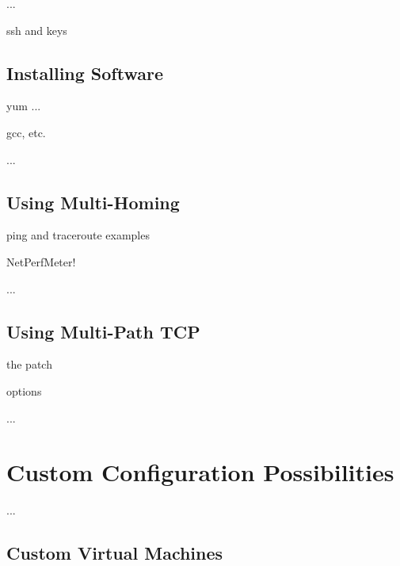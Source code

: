 ...

ssh and keys



\section{Installing Software}
\label{sec:Installing-Software}

yum ...

gcc, etc.

...


\section{Using Multi-Homing}
\label{sec:Using-Multi-Homing}

ping and traceroute examples

NetPerfMeter!

...


\section{Using Multi-Path TCP}
\label{sec:Using-Multi-Path-TCP}

the patch

options

...



\chapter{Custom Configuration Possibilities}
\label{cha:Custom-Configuration-Possibilities}

...


\section{Custom Virtual Machines}
\label{sec:Custom-Virtual-Machines}

